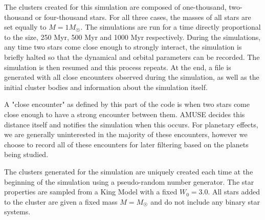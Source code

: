 \documentclass[12pt]{article}
\begin{document}
    The clusters created for this simulation are composed of one-thousand, two-thousand
    or four-thousand stars. For all three cases, the masses of all stars are set equally
    to $M = 1 M_{\astrosun}$. The simulations are run for a time directly proportional
    to the size, 250 Myr, 500 Myr and 1000 Myr respectively.  During the simulations, 
    any time two stars
    come close enough to strongly interact, the simulation is briefly halted so that
    the dynamical and orbital parameters can be recorded. The simulation is then
    resumed and this process repeats. At the end, a file is generated with
    all close encounters observed during the simulation, as well as the initial
    cluster bodies and information about the simulation itself.

    A "close encounter" as defined by this part of the code is when two stars
    come close enough to have a strong encounter between them. AMUSE decides
    this distance itself and notifies the simulation when this occurs. For planetary
    effects, we are generally uninterested in the majority of these encounters, however
    we choose to record all of these encounters for later filtering based on the
    planets being studied.

    The clusters generated for the simulation are uniquely created each time at the
    beginning of the simulation using a pseudo-random number generator. 
    The star properties are sampled from a
    King Model with a fixed $W_0=3.0$. %
    All stars added to the cluster are given a fixed mass $M=M_{\astrosun}$ and do not
    include any binary star systems.     
\end{document}
